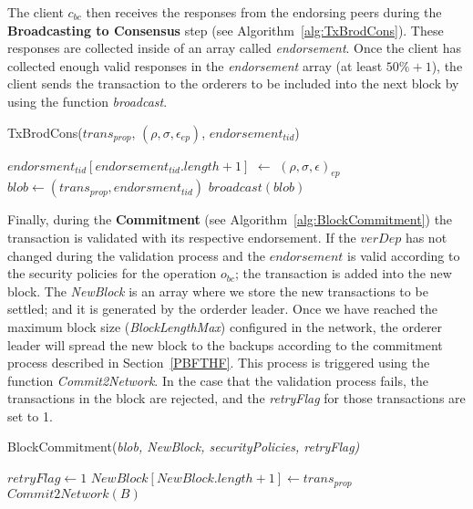 \documentclass[conference]{llncs}
\begin{document}
The client $c_{bc}$ then receives the responses from the endorsing peers during the \textbf{Broadcasting to Consensus} step (see Algorithm~\ref{alg:TxBrodCons}). These responses are collected inside of an array called \textit{endorsement}. Once the client has collected enough valid responses in the \textit{endorsement} array (at least $50\%+1$), the client sends the transaction to the orderers to be included into the next block by using the function \textit{broadcast}. 

\begin{algorithm}[ht]
\caption{TxBrodCons($trans_{prop}$, $(\rho,\sigma,\epsilon_{ep})$, $endorsement_{tid}$)}
\label{alg:TxBrodCons}
\begin{algorithmic}[1]
\STATE $endorsment_{tid}[endorsement_{tid}.length+1]$ $\gets$ $(\rho,\sigma,\epsilon)_{ep}$
\STATE $blob \gets (trans_{prop},endorsment_{tid})$
\RETURN $broadcast(blob)$
\ENDIF
\end{algorithmic}
\end{algorithm}

Finally, during the \textbf{Commitment} (see Algorithm~\ref{alg:BlockCommitment}) the transaction is validated with its respective endorsement. If the $verDep$ has not changed during the validation process and the $endorsement$ is valid according to the security policies for the operation $o_{bc}$; the transaction is added into the new block. The \textit{NewBlock} is an array where we store the new transactions to be settled; and it is generated by the orderder leader. Once we have reached the maximum block size (\textit{BlockLengthMax}) configured in the network, the orderer leader will spread the new block to the backups according to the commitment process described in Section~\ref{PBFTHF}. This process is triggered using the function \textit{Commit2Network}. In the case that the validation process fails, the transactions in the block are rejected, and the \textit{retryFlag} for those transactions are set to 1. 

\begin{algorithm}[ht]
\caption{BlockCommitment(\emph{blob, NewBlock, securityPolicies, retryFlag)}}
\label{alg:BlockCommitment}
\begin{algorithmic}[1]
\RETURN $retryFlag \gets 1$
\ELSE \STATE $NewBlock [NewBlock.length + 1] \gets trans_{prop}$ \ENDIF
{}
\RETURN $Commit2Network(B)$ \ENDIF
\end{algorithmic}
\end{algorithm}
\end{document}
